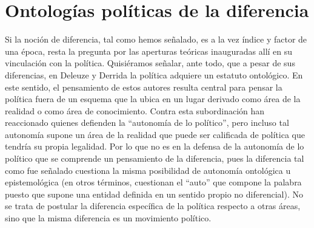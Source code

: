 \documentclass{book}
\begin{document}
\section{Ontologías políticas de la diferencia}

Si la noción de diferencia, tal como hemos señalado, es a la vez índice
y factor de una época, resta la pregunta por las aperturas teóricas
inauguradas allí en su vinculación con la política. Quisiéramos señalar,
ante todo, que a pesar de sus diferencias, en Deleuze y Derrida la
política adquiere un estatuto ontológico. En este sentido, el
pensamiento de estos autores resulta central para pensar la política
fuera de un esquema que la ubica en un lugar derivado como área de la
realidad o como área de conocimiento. Contra esta subordinación han
reaccionado quienes defienden la \enquote{autonomía de lo político}, pero
incluso tal autonomía supone un área de la realidad que puede ser
calificada de política que tendría su propia legalidad. Por lo que no es
en la defensa de la autonomía de lo político que se comprende un
pensamiento de la diferencia, pues la diferencia tal como fue señalado
cuestiona la misma posibilidad de autonomía ontológica u epistemológica
(en otros términos, cuestionan el \enquote{auto} que compone la palabra puesto
que supone una entidad definida en un sentido propio no diferencial). No
se trata de postular la diferencia específica de la política respecto a
otras áreas, sino que la misma diferencia es un movimiento político.
\end{document}
